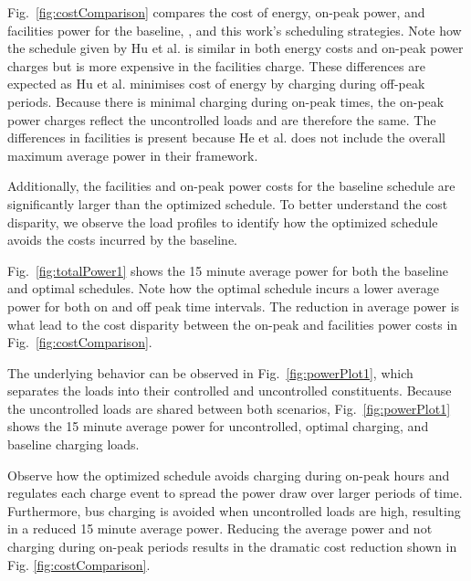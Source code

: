 	\par  Fig.~\ref{fig:costComparison} compares the cost of energy, on-peak power, and facilities power for the baseline, \cite{He_2022_Battery}, and this work's scheduling strategies. Note how the schedule given by Hu et al. is similar in both energy costs and on-peak power charges but is more expensive in the facilities charge. These differences are expected as Hu et al. minimises cost of energy by charging during off-peak periods. Because there is minimal charging during on-peak times, the on-peak power charges reflect the uncontrolled loads and are therefore the same. The differences in facilities is present because He et al. does not include the overall maximum average power in their framework. 
	\par Additionally, the facilities and on-peak power costs for the baseline schedule are significantly larger than the optimized schedule.  To better understand the cost disparity, we observe the load profiles to identify how the optimized schedule avoids the costs incurred by the baseline.
\par Fig.~\ref{fig:totalPower1} shows the 15 minute average power for both the baseline and optimal schedules. Note how the optimal schedule incurs a lower average power for both on and off peak time intervals. The reduction in average power is what lead to the cost disparity between the on-peak and facilities power costs in Fig.~\ref{fig:costComparison}. 
\par The underlying behavior can be observed in Fig.~\ref{fig:powerPlot1}, which separates the loads into their controlled and uncontrolled constituents. Because the uncontrolled loads are shared between both scenarios, Fig.~\ref{fig:powerPlot1} shows the 15 minute average power for uncontrolled, optimal charging, and baseline charging loads. 
\par Observe how the optimized schedule avoids charging during on-peak hours and regulates each charge event to spread the power draw over larger periods of time. Furthermore, bus charging is avoided when uncontrolled loads are high, resulting in a reduced 15 minute average power.  Reducing the average power and not charging during on-peak periods results in the dramatic cost reduction shown in Fig. \ref{fig:costComparison}.

\begin{figure*}
	\centering
	\caption{15-Minute average power for one day.}
	\label{fig:totalPower1}
\end{figure*} 
\begin{figure*}
	\centering
	\caption{Comparison between uncontrolled and bus loads.}
	\label{fig:powerPlot1}
\end{figure*}


